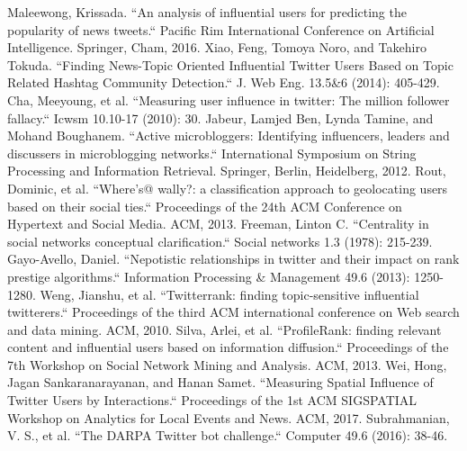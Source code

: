 \begin{thebibliography}{200}
Maleewong, Krissada. ``An analysis of influential users for predicting the popularity of news tweets.`` Pacific Rim International Conference on Artificial Intelligence. Springer, Cham, 2016.\label{appendix:2.13}
Xiao, Feng, Tomoya Noro, and Takehiro Tokuda. ``Finding News-Topic Oriented Influential Twitter Users Based on Topic Related Hashtag Community Detection.`` J. Web Eng. 13.5\&6 (2014): 405-429.\label{appendix:2.14}
Cha, Meeyoung, et al. ``Measuring user influence in twitter: The million follower fallacy.`` Icwsm 10.10-17 (2010): 30.\label{appendix:2.15}
Jabeur, Lamjed Ben, Lynda Tamine, and Mohand Boughanem. ``Active microbloggers: Identifying influencers, leaders and discussers in microblogging networks.`` International Symposium on String Processing and Information Retrieval. Springer, Berlin, Heidelberg, 2012.\label{appendix:2.16}
Rout, Dominic, et al. ``Where's@ wally?: a classification approach to geolocating users based on their social ties.`` Proceedings of the 24th ACM Conference on Hypertext and Social Media. ACM, 2013.\label{appendix:2.19}
Freeman, Linton C. ``Centrality in social networks conceptual clarification.`` Social networks 1.3 (1978): 215-239.\label{appendix:2.22}
Gayo-Avello, Daniel. ``Nepotistic relationships in twitter and their impact on rank prestige algorithms.`` Information Processing \& Management 49.6 (2013): 1250-1280.\label{appendix:2.23}
Weng, Jianshu, et al. ``Twitterrank: finding topic-sensitive influential twitterers.`` Proceedings of the third ACM international conference on Web search and data mining. ACM, 2010.\label{appendix:2.24}
Silva, Arlei, et al. ``ProfileRank: finding relevant content and influential users based on information diffusion.`` Proceedings of the 7th Workshop on Social Network Mining and Analysis. ACM, 2013.\label{appendix:2.25}
Wei, Hong, Jagan Sankaranarayanan, and Hanan Samet. ``Measuring Spatial Influence of Twitter Users by Interactions.`` Proceedings of the 1st ACM SIGSPATIAL Workshop on Analytics for Local Events and News. ACM, 2017.\label{appendix:2.26}
Subrahmanian, V. S., et al. ``The DARPA Twitter bot challenge.`` Computer 49.6 (2016): 38-46.\label{appendix:2.27}


\end{thebibliography}
